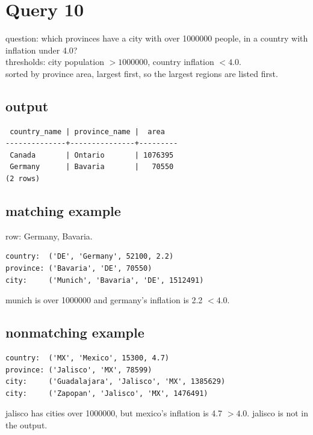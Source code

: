 \documentclass[11pt]{article}
\begin{document}
\section*{Query 10}

question: which provinces have a city with over 1000000 people, in a country with inflation under 4.0? \\
thresholds: city population $> 1000000$, country inflation $< 4.0$. \\
sorted by province area, largest first, so the largest regions are listed first.

\subsection*{output}
{\small
\begin{verbatim}
 country_name | province_name |  area
--------------+---------------+---------
 Canada       | Ontario       | 1076395
 Germany      | Bavaria       |   70550
(2 rows)
\end{verbatim}
}

\subsection*{matching example}
row: Germany, Bavaria.
\begin{verbatim}
country:  ('DE', 'Germany', 52100, 2.2)
province: ('Bavaria', 'DE', 70550)
city:     ('Munich', 'Bavaria', 'DE', 1512491)
\end{verbatim}
munich is over 1000000 and germany's inflation is 2.2 $< 4.0$.

\subsection*{nonmatching example}
\begin{verbatim}
country:  ('MX', 'Mexico', 15300, 4.7)
province: ('Jalisco', 'MX', 78599)
city:     ('Guadalajara', 'Jalisco', 'MX', 1385629)
city:     ('Zapopan', 'Jalisco', 'MX', 1476491)
\end{verbatim}
jalisco has cities over 1000000, but mexico's inflation is 4.7 $> 4.0$. jalisco is not in the output.
\end{document}
